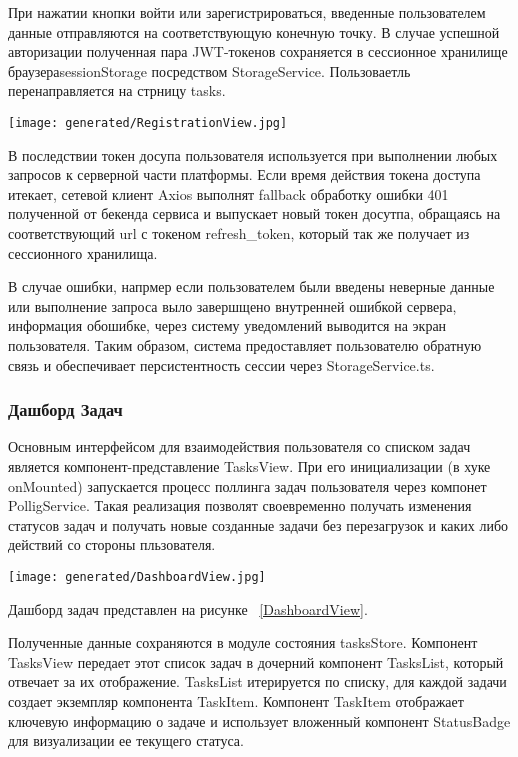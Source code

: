 При нажатии кнопки войти или зарегистрироваться, введенные пользователем данные отправляются на соответствующую конечную точку. В случае успешной авторизации полученная пара JWT-токенов сохраняется в сессионное хранилище браузераsessionStorage посредством StorageService. Пользоваетль перенаправляется на стрницу \/tasks.

\begin{figure*}[!t]
  \centering
  \texttt{[image: generated/RegistrationView.jpg]}
  \caption{Форма регистрации}
  \label{RegistrationView}
\end{figure*}

В последствии токен досупа пользователя используется при выполнении любых запросов к серверной части платформы. Если время действия токена доступа итекает, сетевой клиент Axios выполнят fallback обработку ошибки 401 полученной от бекенда сервиса и выпускает новый токен досутпа, обращаясь на соответствующий url с токеном refresh\_token, который так же получает из сессионного хранилища.

В случае ошибки, напрмер если пользователем были введены неверные данные или выполнение запроса выло завершщено внутренней ошибкой сервера, информация обошибке, через систему уведомлений выводится на экран пользователя.  Таким образом, система предоставляет пользователю обратную связь и обеспечивает персистентность сессии через StorageService.ts.

\subsubsection{Дашборд Задач}

Основным интерфейсом для взаимодействия пользователя со списком задач является компонент-представление TasksView. При его инициализации (в хуке onMounted)\cite{tikhonova2021design} запускается процесс поллинга задач пользователя через компонет PolligService. Такая реализация позволят своевременно получать изменения статусов задач и получать новые созданные задачи без перезагрузок и каких либо действий со стороны пльзователя.

\begin{figure*}[!t]
  \centering
  \texttt{[image: generated/DashboardView.jpg]}
  \caption{Дашборд задач пользователя}
  \label{DashboardView}
\end{figure*}

Дашборд задач представлен на рисунке ~\ref{DashboardView}.

Полученные данные сохраняются в модуле состояния tasksStore.
Компонент TasksView передает этот список задач в дочерний компонент TasksList, который отвечает за их отображение.
TasksList итерируется по списку, для каждой задачи создает экземпляр компонента TaskItem.
Компонент TaskItem отображает ключевую информацию о задаче и использует вложенный компонент StatusBadge для визуализации ее текущего статуса.

